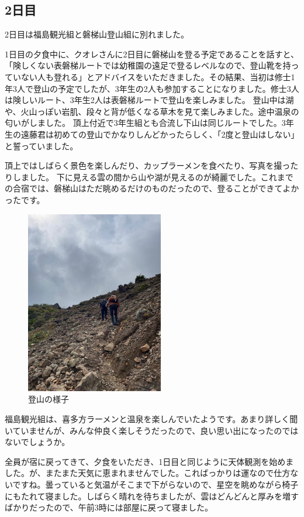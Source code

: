\documentclass[../main]{subfiles}
\begin{document}
\subsection{2日目}
2日目は福島観光組と磐梯山登山組に別れました。

1日目の夕食中に、クオレさんに2日目に磐梯山を登る予定であることを話すと、「険しくない表磐梯ルートでは幼稚園の遠足で登るレベルなので、登山靴を持っていない人も登れる」とアドバイスをいただきました。その結果、当初は修士1年3人で登山の予定でしたが、3年生の2人も参加することになりました。修士3人は険しいルート、3年生2人は表磐梯ルートで登山を楽しみました。
登山中は湖や、火山っぽい岩肌、段々と背が低くなる草木を見て楽しみました。途中温泉の匂いがしました。
頂上付近で3年生組とも合流し下山は同じルートでした。3年生の遠藤君は初めての登山でかなりしんどかったらしく、「2度と登山はしない」と誓っていました。

頂上ではしばらく景色を楽しんだり、カップラーメンを食べたり、写真を撮ったりしました。
下に見える雲の間から山や湖が見えるのが綺麗でした。これまでの合宿では、磐梯山はただ眺めるだけのものだったので、登ることができてよかったです。
\begin{figure}[H]
\centering
\includegraphics[width=6cm]{sections/Nakahara/IMG_8389.jpg}
\caption{登山の様子}
\centering
\end{figure}

福島観光組は、喜多方ラーメンと温泉を楽しんでいたようです。あまり詳しく聞いていませんが、みんな仲良く楽しそうだったので、良い思い出になったのではないでしょうか。

全員が宿に戻ってきて、夕食をいただき、1日目と同じように天体観測を始めました。が、またまた天気に恵まれませんでした。こればっかりは運なので仕方ないですね。曇っていると気温がそこまで下がらないので、星空を眺めながら椅子にもたれて寝ました。しばらく晴れを待ちましたが、雲はどんどんと厚みを増すばかりだったので、午前3時には部屋に戻って寝ました。
\end{document}
